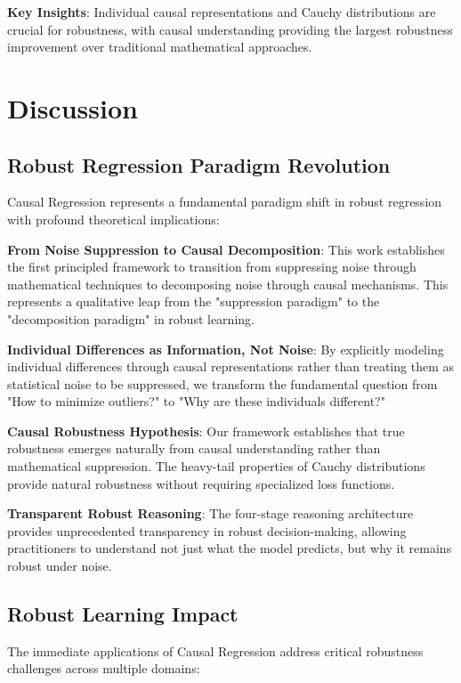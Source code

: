 \documentclass[conference]{IEEEtran}
\begin{document}
\textbf{Key Insights}: Individual causal representations and Cauchy distributions are crucial for robustness, with causal understanding providing the largest robustness improvement over traditional mathematical approaches.

\section{Discussion}
\label{sec:discussion}

\subsection{Robust Regression Paradigm Revolution}

Causal Regression represents a fundamental paradigm shift in robust regression with profound theoretical implications:

\textbf{From Noise Suppression to Causal Decomposition}: This work establishes the first principled framework to transition from suppressing noise through mathematical techniques to decomposing noise through causal mechanisms. This represents a qualitative leap from the "suppression paradigm" to the "decomposition paradigm" in robust learning.

\textbf{Individual Differences as Information, Not Noise}: By explicitly modeling individual differences through causal representations rather than treating them as statistical noise to be suppressed, we transform the fundamental question from "How to minimize outliers?" to "Why are these individuals different?"

\textbf{Causal Robustness Hypothesis}: Our framework establishes that true robustness emerges naturally from causal understanding rather than mathematical suppression. The heavy-tail properties of Cauchy distributions provide natural robustness without requiring specialized loss functions.

\textbf{Transparent Robust Reasoning}: The four-stage reasoning architecture provides unprecedented transparency in robust decision-making, allowing practitioners to understand not just what the model predicts, but why it remains robust under noise.

\subsection{Robust Learning Impact}

The immediate applications of Causal Regression address critical robustness challenges across multiple domains:
\end{document}
